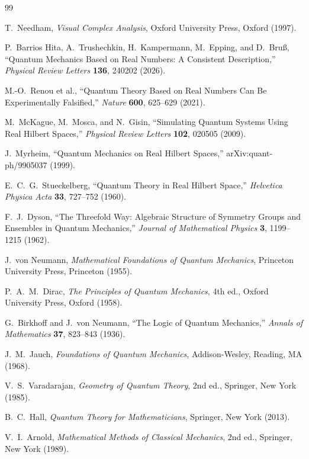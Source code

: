 \documentclass[12pt]{article}
\begin{document}
\begin{thebibliography}{99}

T.\ Needham,
\textit{Visual Complex Analysis},
Oxford University Press, Oxford (1997).

P.\ Barrios Hita, A.\ Trushechkin, H.\ Kampermann, M.\ Epping,
and D.\ Bru{\ss},
``Quantum Mechanics Based on Real Numbers: A Consistent Description,''
\textit{Physical Review Letters} \textbf{136}, 240202 (2026).

M.-O.\ Renou et al.,
``Quantum Theory Based on Real Numbers Can Be Experimentally Falsified,''
\textit{Nature} \textbf{600}, 625--629 (2021).

M.\ McKague, M.\ Mosca, and N.\ Gisin,
``Simulating Quantum Systems Using Real Hilbert Spaces,''
\textit{Physical Review Letters} \textbf{102}, 020505 (2009).

J.\ Myrheim,
``Quantum Mechanics on Real Hilbert Spaces,''
arXiv:quant-ph/9905037 (1999).

E.\ C.\ G.\ Stueckelberg,
``Quantum Theory in Real Hilbert Space,''
\textit{Helvetica Physica Acta} \textbf{33}, 727--752 (1960).

F.\ J.\ Dyson,
``The Threefold Way: Algebraic Structure of Symmetry Groups and Ensembles
in Quantum Mechanics,''
\textit{Journal of Mathematical Physics} \textbf{3}, 1199--1215 (1962).

J.\ von Neumann,
\textit{Mathematical Foundations of Quantum Mechanics},
Princeton University Press, Princeton (1955).

P.\ A.\ M.\ Dirac,
\textit{The Principles of Quantum Mechanics}, 4th ed.,
Oxford University Press, Oxford (1958).

G.\ Birkhoff and J.\ von Neumann,
``The Logic of Quantum Mechanics,''
\textit{Annals of Mathematics} \textbf{37}, 823--843 (1936).

J.\ M.\ Jauch,
\textit{Foundations of Quantum Mechanics},
Addison-Wesley, Reading, MA (1968).

V.\ S.\ Varadarajan,
\textit{Geometry of Quantum Theory}, 2nd ed.,
Springer, New York (1985).

B.\ C.\ Hall,
\textit{Quantum Theory for Mathematicians},
Springer, New York (2013).

V.\ I.\ Arnold,
\textit{Mathematical Methods of Classical Mechanics}, 2nd ed.,
Springer, New York (1989).


\end{thebibliography}
\end{document}
